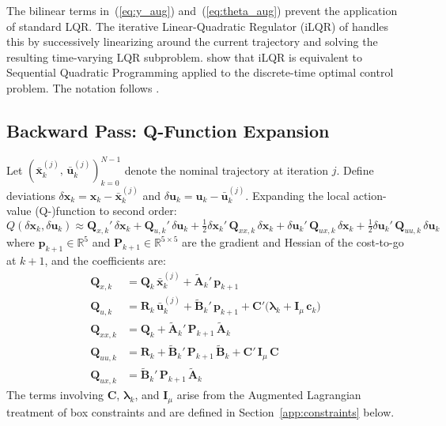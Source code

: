 \documentclass[12pt, a4paper]{article}
\begin{document}
The bilinear terms in~(\ref{eq:y_aug}) and~(\ref{eq:theta_aug}) prevent
the application of standard LQR. The iterative Linear-Quadratic Regulator
(iLQR) of \citet{li2004iterative} handles this by successively linearizing
around the current trajectory and solving the resulting time-varying LQR
subproblem. \citet{sharma2025sqp} show that iLQR is equivalent to Sequential
Quadratic Programming applied to the discrete-time optimal control problem.
The notation follows \citet[Chapters~3--4]{bertsekas2017dynamic}.

\subsection{Backward Pass: Q-Function Expansion}
\label{app:backward}

Let $(\bar{\bm{x}}_k^{(j)},\, \bar{\bm{u}}_k^{(j)})_{k=0}^{N-1}$ denote the
nominal trajectory at iteration $j$. Define deviations
$\delta\bm{x}_k = \bm{x}_k - \bar{\bm{x}}_k^{(j)}$ and
$\delta\bm{u}_k = \bm{u}_k - \bar{\bm{u}}_k^{(j)}$. Expanding the local
action-value (Q-)function to second order:
%
\begin{equation}
    Q(\delta\bm{x}_k, \delta\bm{u}_k) \approx
    \bm{Q}_{x,k}'\,\delta\bm{x}_k
    + \bm{Q}_{u,k}'\,\delta\bm{u}_k
    + \tfrac{1}{2}\delta\bm{x}_k'\,\bm{Q}_{xx,k}\,\delta\bm{x}_k
    + \delta\bm{u}_k'\,\bm{Q}_{ux,k}\,\delta\bm{x}_k
    + \tfrac{1}{2}\delta\bm{u}_k'\,\bm{Q}_{uu,k}\,\delta\bm{u}_k
    \label{eq:Qfunc_app}
\end{equation}
%
where $\bm{p}_{k+1} \in \mathbb{R}^5$ and
$\bm{P}_{k+1} \in \mathbb{R}^{5 \times 5}$ are the gradient and Hessian of the
cost-to-go at $k+1$, and the coefficients are:
%
\begin{align}
    \bm{Q}_{x,k}  &= \bm{Q}_k\,\bar{\bm{x}}_k^{(j)}
                      + \tilde{\bm{A}}_k'\,\bm{p}_{k+1}
    \label{eq:Qx_app} \\[4pt]
    \bm{Q}_{u,k}  &= \bm{R}_k\,\bar{\bm{u}}_k^{(j)}
                      + \tilde{\bm{B}}_k'\,\bm{p}_{k+1}
                      + \bm{C}'\bigl(\bm{\lambda}_k + \bm{I}_\mu\, \bm{c}_k\bigr)
    \label{eq:Qu_app} \\[4pt]
    \bm{Q}_{xx,k} &= \bm{Q}_k
                      + \tilde{\bm{A}}_k'\,\bm{P}_{k+1}\,\tilde{\bm{A}}_k
    \label{eq:Qxx_app} \\[4pt]
    \bm{Q}_{uu,k} &= \bm{R}_k
                      + \tilde{\bm{B}}_k'\,\bm{P}_{k+1}\,\tilde{\bm{B}}_k
                      + \bm{C}'\,\bm{I}_\mu\,\bm{C}
    \label{eq:Quu_app} \\[4pt]
    \bm{Q}_{ux,k} &= \tilde{\bm{B}}_k'\,\bm{P}_{k+1}\,\tilde{\bm{A}}_k
    \label{eq:Qux_app}
\end{align}
%
The terms involving $\bm{C}$, $\bm{\lambda}_k$, and $\bm{I}_\mu$ arise from
the Augmented Lagrangian treatment of box constraints and are defined in
Section~\ref{app:constraints} below.
\end{document}

